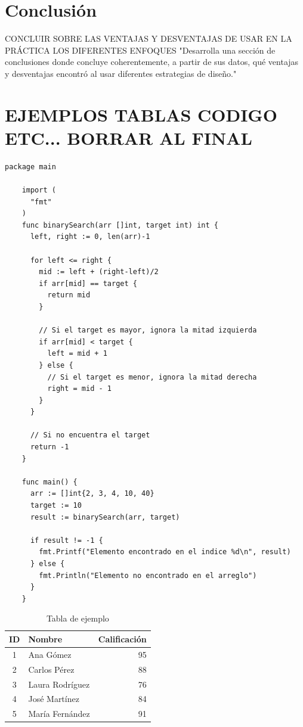 \documentclass[letterpaper,10pt]{article}
\begin{document}
\section{Conclusión}
\label{sec:conclusion}
CONCLUIR SOBRE LAS VENTAJAS Y DESVENTAJAS DE USAR EN LA PRÁCTICA LOS DIFERENTES ENFOQUES
"Desarrolla una sección de conclusiones donde concluye coherentemente, a partir de sus datos, qué ventajas y desventajas encontró al usar diferentes estrategias de diseño."
\section{EJEMPLOS TABLAS CODIGO ETC... BORRAR AL FINAL}
\begin{lstlisting}[caption={Algoritmo de búsqueda binaria en Go}, label={lst:binary_search}]
    package main
    
    import (
      "fmt"
    )
    func binarySearch(arr []int, target int) int {
      left, right := 0, len(arr)-1
      
      for left <= right {
        mid := left + (right-left)/2
        if arr[mid] == target {
          return mid
        }
        
        // Si el target es mayor, ignora la mitad izquierda
        if arr[mid] < target {
          left = mid + 1
        } else {
          // Si el target es menor, ignora la mitad derecha
          right = mid - 1
        }
      }
      
      // Si no encuentra el target
      return -1
    }
    
    func main() {
      arr := []int{2, 3, 4, 10, 40}
      target := 10
      result := binarySearch(arr, target)
      
      if result != -1 {
        fmt.Printf("Elemento encontrado en el indice %d\n", result)
      } else {
        fmt.Println("Elemento no encontrado en el arreglo")
      }
    }
\end{lstlisting}

\begin{table}[H]
    \centering
    \begin{tabular}{|c|l|r|}
      \hline
      \textbf{ID} & \textbf{Nombre} & \textbf{Calificación} \\ \hline
      1 & Ana Gómez & 95 \\ \hline
      2 & Carlos Pérez & 88 \\ \hline
      3 & Laura Rodríguez & 76 \\ \hline
      4 & José Martínez & 84 \\ \hline
      5 & María Fernández & 91 \\ \hline
    \end{tabular}
    \caption{Tabla de ejemplo}
    \label{tab:ejemplo}
\end{table}
\end{document}
